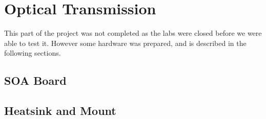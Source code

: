\section{Optical Transmission}%
\label{optical_transmission}
This part of the project was not completed as the labs were closed before we
were able to test it. However some hardware was prepared, and is described in
the following sections.
\subsection{SOA Board}%
\label{sub:soa_board}

\subsection{Heatsink and Mount}%
\label{sub:heatsink_and_mount}





